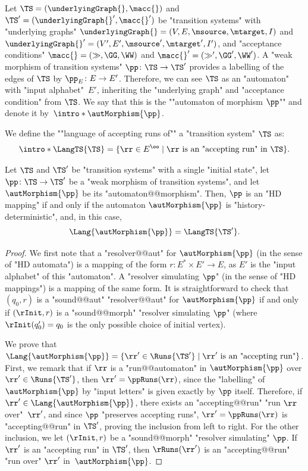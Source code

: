 \documentclass{theoretics}
\begin{document}
\AP Let $\TS = (\underlyingGraph{}, \macc{})$ and $\TS' = (\underlyingGraph{}', \macc{}')$ be "transition systems" with "underlying graphs" $\underlyingGraph{} =(V ,E , \msource , \mtarget, I)$ and $\underlyingGraph{}' =(V' ,E' , \msource' , \mtarget', I')$, and "acceptance conditions" $\macc{} = (\gg, \GG, \WW)$ and  $\macc{}' = (\gg', \GG', \WW')$. 
A "weak morphism of transition systems" $\pp\colon \TS \to \TS'$ provides a labelling of the edges of $\TS$ by $\pp_E\colon E \to E'$. Therefore, we can see $\TS$ as an "automaton" with "input alphabet"~$E'$, inheriting the "underlying graph" and "acceptance condition" from $\TS$. 
We say that this is the ""automaton of morphism $\pp$"" and denote it by~$\intro*\autMorphism{\pp}$.

\AP We define the ""language of accepting runs of"" a "transition system" $\TS$ as:
\[ \intro*\LangTS{\TS} = \{\rr\in E^\oo \mid \rr \text{ is an "accepting run" in } \TS \}. \]


\begin{lemma}\label{lemma-acd:morphism_HD-iff-automaton-HD}
	Let $\TS$ and $\TS'$ be "transition systems" with a single "initial state", let $\pp\colon \TS \to \TS'$ be a "weak morphism of transition systems", and let $\autMorphism{\pp}$ be its "automaton@@morphism".
	Then, $\pp$ is an "HD mapping" if and only if the automaton $\autMorphism{\pp}$ is "history-deterministic", and, in this case, \[\Lang{\autMorphism{\pp}} = \LangTS{\TS'}.\]
\end{lemma}
\begin{proof}
	We first note that a "resolver@@aut" for $\autMorphism{\pp}$ (in the sense of "HD automata") is a mapping of the form $r\colon E^* \times E' \to E$, as $E'$ is the "input alphabet" of this "automaton". A "resolver simulating $\pp$" (in the sense of "HD mappings") is a mapping of the same form.
	It is straightforward to check that $(q_0, r)$ is a "sound@@aut" "resolver@@aut" for $\autMorphism{\pp}$ if and only if $(\rInit, r)$ is a "sound@@morph" "resolver simulating $\pp$" (where $\rInit(q_0') = q_0$ is the only possible choice of initial vertex).
	
	
	We prove that $\Lang{\autMorphism{\pp}} = \{\rr'\in \Runs{\TS'} \mid \rr' \text{ is an "accepting run"}\}$. 
	First, we remark that if $\rr$ is a "run@@automaton" in $\autMorphism{\pp}$ over $\rr'\in\Runs{\TS'}$, then $\rr' = \ppRuns(\rr)$, since the "labelling" of $\autMorphism{\pp}$ by "input letters" is given exactly by $\pp$ itself. Therefore, if $\rr'\in \Lang{\autMorphism{\pp}}$, there exists an "accepting@@run" "run $\rr$ over"~$\rr'$, and since $\pp$ "preserves accepting runs",  $\rr' = \ppRuns(\rr)$ is "accepting@@run" in $\TS'$, proving the inclusion from left to right. For the other inclusion, we let $(\rInit, r)$ be a "sound@@morph" "resolver simulating" $\pp$. If $\rr'$ is an "accepting run" in $\TS'$, then $\rRuns(\rr')$ is an "accepting@@run" "run over" $\rr'$ in~$\autMorphism{\pp}$.
\end{proof}
\end{document}
